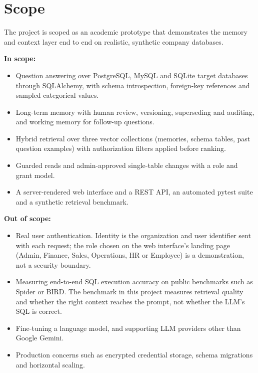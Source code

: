 \section{Scope}
The project is scoped as an academic prototype that demonstrates the memory and context
layer end to end on realistic, synthetic company databases.

\textbf{In scope:}
\begin{itemize}[leftmargin=*, topsep=4pt, itemsep=4pt]
    \item Question answering over PostgreSQL, MySQL and SQLite target databases through
          SQLAlchemy, with schema introspection, foreign-key references and sampled
          categorical values.
    \item Long-term memory with human review, versioning, superseding and auditing, and
          working memory for follow-up questions.
    \item Hybrid retrieval over three vector collections (memories, schema tables, past
          question examples) with authorization filters applied before ranking.
    \item Guarded reads and admin-approved single-table changes with a role and grant model.
    \item A server-rendered web interface and a REST API, an automated pytest suite and a
          synthetic retrieval benchmark.
\end{itemize}

\textbf{Out of scope:}
\begin{itemize}[leftmargin=*, topsep=4pt, itemsep=4pt]
    \item Real user authentication. Identity is the organization and user identifier sent
          with each request; the role chosen on the web interface's landing page (Admin, Finance, Sales,
          Operations, HR or Employee) is a demonstration,
          not a security boundary.
    \item Measuring end-to-end SQL execution accuracy on public benchmarks such as Spider or
          BIRD. The benchmark in this project measures retrieval quality and whether the
          right context reaches the prompt, not whether the LLM's SQL is correct.
    \item Fine-tuning a language model, and supporting LLM providers other than Google
          Gemini.
    \item Production concerns such as encrypted credential storage, schema migrations and
          horizontal scaling.
\end{itemize}

